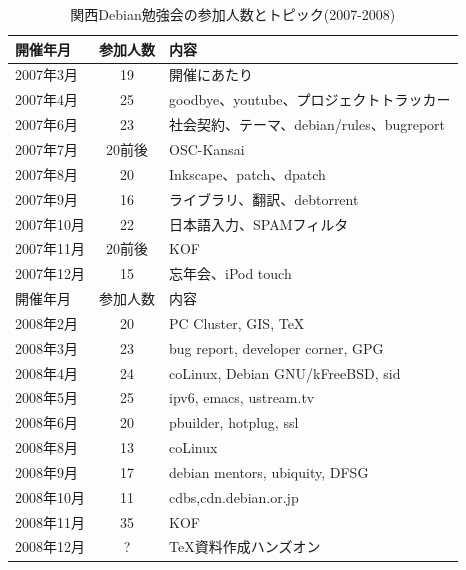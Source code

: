 \documentclass[mingoth,a4paper]{jsarticle}
\begin{document}

\begin{table}
  \begin{minipage}{.5\linewidth}
    \caption{関西Debian勉強会の参加人数とトピック(2007-2008)}
    \begin{center}
      \begin{tabular}{|l|c|p{10em}|}
        \hline
        開催年月   & 参加人数 & 内容 \\
        \hline
        2007年3月  & 19       & 開催にあたり \\
        2007年4月  & 25       & goodbye、youtube、プロジェクトトラッカー\\
        2007年6月  & 23       & 社会契約、テーマ、debian/rules、bugreport\\
        2007年7月  & 20前後   & OSC-Kansai \\
        2007年8月  & 20       & Inkscape、patch、dpatch\\
        2007年9月  & 16       & ライブラリ、翻訳、debtorrent\\
        2007年10月 & 22       & 日本語入力、SPAMフィルタ\\
        2007年11月 & 20前後   & KOF \\
        2007年12月 & 15       & 忘年会、iPod touch\\
        \hline
        \hline
        開催年月   & 参加人数 & 内容 \\
        \hline
        2008年2月  & 20       & PC Cluster, GIS, \TeX \\
        2008年3月  & 23       & bug report, developer corner, GPG \\
        2008年4月  & 24       & coLinux, Debian GNU/kFreeBSD, sid \\
        2008年5月  & 25       & ipv6, emacs, ustream.tv\\
        2008年6月  & 20       & pbuilder, hotplug, ssl\\
        2008年8月  & 13       & coLinux \\
        2008年9月  & 17       & debian mentors, ubiquity, DFSG\\
        2008年10月 & 11       & cdbs,cdn.debian.or.jp \\
        2008年11月 & 35       & KOF \\
        2008年12月 & ?        & TeX資料作成ハンズオン\\
        \hline
      \end{tabular}
    \end{center}
  \end{minipage}

\end{table}
\end{document}
